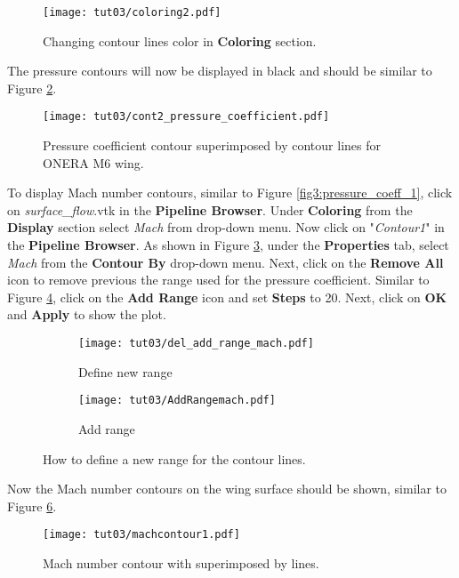 \begin{figure}[htbp]
    \centering
    \texttt{[image: tut03/coloring2.pdf]}
    \caption{Changing contour lines color in \textbf{Coloring} section.}
    \label{fig3:colorby2}
\end{figure}
The pressure contours will now be displayed in black and should be similar to Figure \ref{fig3:pressure_contour_lines}.
\begin{figure}[htbp]
    \centering
    \texttt{[image: tut03/cont2\_pressure\_coefficient.pdf]}
    \caption{Pressure coefficient contour superimposed by contour lines for ONERA M6 wing.}
    \label{fig3:pressure_contour_lines}
\end{figure}

To display Mach number contours, similar to Figure \ref{fig3:pressure_coeff_1}, click on \textit{surface\_flow}.vtk in the \textbf{Pipeline Browser}. Under \textbf{Coloring} from the \textbf{Display} section select \textit{Mach} from drop-down menu. Now click on "\textit{Contour1}" in the \textbf{Pipeline Browser}. As shown in Figure \ref{fig3:contourby2 a}, under the \textbf{Properties} tab, select \textit{Mach} from the \textbf{Contour By} drop-down menu. Next, click on the \textbf{Remove All} icon to remove previous the range used for the pressure coefficient. Similar to Figure \ref{fig3:contourby2 b}, click on the \textbf{Add Range} icon and set \textbf{Steps} to 20. Next, click on \textbf{OK} and \textbf{Apply} to show the plot.
\begin{figure}[htbp]
    \centering
     \begin{subfigure}[b]{.4\textwidth}
         \centering
         \texttt{[image: tut03/del\_add\_range\_mach.pdf]}
         \caption{Define new range}
         \label{fig3:contourby2 a}
     \end{subfigure}
     \hfill
     \begin{subfigure}[b]{.4\textwidth}
         \centering
         \texttt{[image: tut03/AddRangemach.pdf]}
         \caption{Add range}
         \label{fig3:contourby2 b}
     \end{subfigure}     
    \caption{How to define a new range for the contour lines.}
    \label{fig3:contourby2}
\end{figure}
Now the Mach number contours on the wing surface should be shown, similar to Figure \ref{fig3:mach_contour}.
\begin{figure}[htbp]
    \centering
    \texttt{[image: tut03/machcontour1.pdf]}
    \caption{Mach number contour with superimposed by lines.}
    \label{fig3:mach_contour}
\end{figure}
